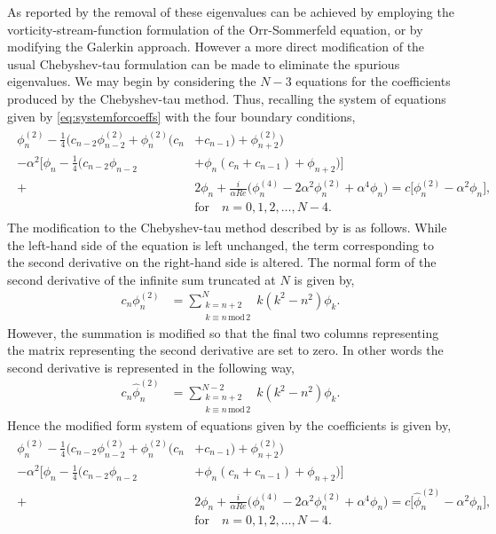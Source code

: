 \documentclass[a4paper, 12pt, twoside, openright]{article}
\numberwithin{equation}{section}
\begin{document}
As reported by \cite{Mcfadden90} the removal of these eigenvalues can be achieved by employing the vorticity-stream-function formulation of the Orr-Sommerfeld equation, or by modifying the Galerkin approach. However a more direct modification of the usual Chebyshev-tau formulation can be made to eliminate the spurious eigenvalues. We may begin by considering the $N-3$ equations for the coefficients produced by the Chebyshev-tau method. Thus, recalling the system of equations given by \eqref{eq:systemforcoeffs} with the four boundary conditions,
\begin{align}
\begin{split}
\phi_n^{(2)} - \frac{1}{4}\bigl(c_{n-2}\phi_{n-2}^{(2)}+\phi_n^{(2)}(c_n& + c_{n-1})+\phi_{n+2}^{(2)}\bigr) \\ - \alpha^2\bigl[\phi_n - \frac{1}{4}\bigl(c_{n-2}\phi_{n-2}&+\phi_n(c_n + c_{n-1}) +\phi_{n+2}\bigr) \bigr]\\+ &2\phi_n + \frac{i}{\alpha Re}\bigl(\phi_n^{(4)}-2\alpha^2\phi_n^{(2)}+ \alpha^4\phi_n  \bigr) = c\bigl[\phi_n^{(2)} - \alpha^2 \phi_n\bigr], \\
&\text{for} \quad n=0,1,2,\dots, N-4.
\end{split}
\end{align}
The modification to the Chebyshev-tau method described by \cite{Mcfadden90} is as follows. While the left-hand side of the equation is left unchanged, the term corresponding to the second derivative on the right-hand side is altered. The normal form of the second derivative of the infinite sum truncated at $N$ is given by,
\begin{align}
c_n\phi_n^{(2)} &= \sum_{\substack{k=n+2 \\ k\equiv n\, \mathrm{mod}\, 2}}^{N} k(k^2 - n^2)\phi_k.
\end{align}
However, the summation is modified so that the final two columns representing the matrix representing the second derivative are set to zero. In other words the second derivative is represented in the following way,
\begin{align}
c_n\hat\phi_{n}^{(2)} &= \sum_{\substack{k=n+2 \\ k\equiv n\, \mathrm{mod}\, 2}}^{N-2} k(k^2 - n^2)\phi_k.
\end{align}
Hence the modified form system of equations given by the coefficients is given by,
\begin{align}
\begin{split}
\phi_n^{(2)} - \frac{1}{4}\bigl(c_{n-2}\phi_{n-2}^{(2)}+\phi_n^{(2)}(c_n& + c_{n-1})+\phi_{n+2}^{(2)}\bigr) \\ - \alpha^2\bigl[\phi_n - \frac{1}{4}\bigl(c_{n-2}\phi_{n-2}&+\phi_n(c_n + c_{n-1}) +\phi_{n+2}\bigr) \bigr]\\+ &2\phi_n + \frac{i}{\alpha Re}\bigl(\phi_n^{(4)}-2\alpha^2\phi_n^{(2)}+ \alpha^4\phi_n  \bigr) = c\bigl[\hat\phi_n^{(2)} - \alpha^2 \phi_n\bigr], \\
&\text{for} \quad n=0,1,2,\dots, N-4.
\end{split}
\end{align}
\end{document}
